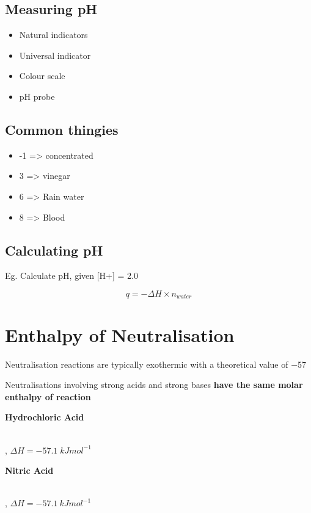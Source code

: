 	\subsection{Measuring pH}
		\begin{itemize}
			\item Natural indicators
			\item Universal indicator
			\item Colour scale
			\item pH probe
		\end{itemize}
	
	\subsection{Common thingies}
		\begin{itemize}
			\item -1 => concentrated 
			\item 3 => vinegar
			\item 6 => Rain water
			\item 8 => Blood
		\end{itemize}
	
	\subsection{Calculating pH}
		Eg. Calculate pH, given [H+] = 2.0

$$q = - \Delta H \times n_{water}$$
\section{Enthalpy of Neutralisation} 
	Neutralisation reactions are typically exothermic with a theoretical value of \qty{-57}{\enthalpy}

	\begin{center}
	\end{center}

	Neutralisations involving strong acids and strong bases \textbf{have the same molar enthalpy of reaction}

	\textbf{Hydrochloric Acid}
	\begin{center}
		 \\
		, $\Delta H = -57.1 \; kJmol^{-1}$
	\end{center}

	\textbf{Nitric Acid}
	\begin{center}
		 \\
		, $\Delta H = -57.1 \: kJmol^{-1}$
	\end{center}

